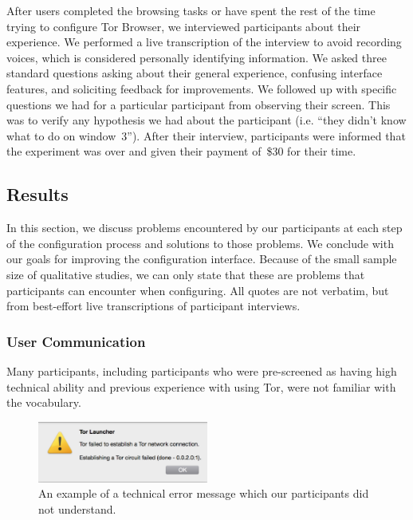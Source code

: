 \documentclass[USenglish,oneside,twocolumn]{article}
\begin{document}
After users completed the browsing tasks or have spent the rest of the time
trying to configure Tor Browser, we interviewed participants about their experience.
We performed a live transcription of the interview to avoid recording voices, which is
considered personally identifying information. 
We asked three standard questions asking about their general experience, 
confusing interface features, and soliciting feedback for improvements. We followed up
with specific questions we had for a particular participant from observing their screen. 
This was to verify any hypothesis we had about the participant (i.e. ``they didn't know what to do on window~3'').  
After their interview, participants were informed that the experiment was over and 
given their payment of~\$30 for their time. 

\subsection{Results} 
In this section, we discuss problems encountered by our participants at each step of the configuration process and solutions to those problems. We conclude with our goals for improving the configuration interface. Because of the small sample size of qualitative studies, we can only state that these are problems that participants can encounter when configuring. All quotes are not verbatim, but from best-effort live transcriptions of participant interviews.

\subsubsection{User Communication} 
Many participants, including participants who were pre-screened as having high technical ability and previous experience with using Tor, were not familiar with the vocabulary. 

\begin{figure}[t]
  \centering
    \includegraphics[width=0.5\textwidth]{error.png}
    \caption{An example of a technical error message which our participants did not understand.}
\label{fig:error}
\end{figure}
\end{document}
